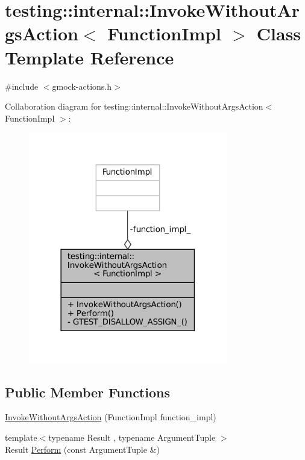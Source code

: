 \hypertarget{classtesting_1_1internal_1_1InvokeWithoutArgsAction}{}\section{testing\+:\+:internal\+:\+:Invoke\+Without\+Args\+Action$<$ Function\+Impl $>$ Class Template Reference}
\label{classtesting_1_1internal_1_1InvokeWithoutArgsAction}


{\ttfamily \#include $<$gmock-\/actions.\+h$>$}



Collaboration diagram for testing\+:\+:internal\+:\+:Invoke\+Without\+Args\+Action$<$ Function\+Impl $>$\+:
\nopagebreak
\begin{figure}[H]
\begin{center}
\leavevmode
\includegraphics[width=246pt]{classtesting_1_1internal_1_1InvokeWithoutArgsAction__coll__graph}
\end{center}
\end{figure}
\subsection*{Public Member Functions}
\begin{DoxyCompactItemize}
\item 
\hyperlink{classtesting_1_1internal_1_1InvokeWithoutArgsAction_a05d4006d8ab70e78172bf678b1d15f18}{Invoke\+Without\+Args\+Action} (Function\+Impl function\+\_\+impl)
\item 
{\footnotesize template$<$typename Result , typename Argument\+Tuple $>$ }\\Result \hyperlink{classtesting_1_1internal_1_1InvokeWithoutArgsAction_abdad2b7d19ff1cbd1d07a4bd585e3f4c}{Perform} (const Argument\+Tuple \&)
\end{DoxyCompactItemize}
